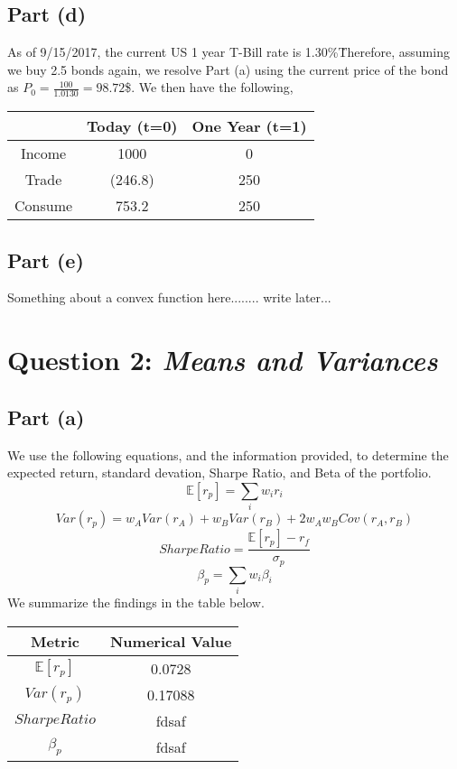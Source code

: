 \documentclass[12pt]{article}
\begin{document}
		\subsection{Part (d)}
		
			As of 9/15/2017, the current US 1 year T-Bill rate is 1.30\%\. Therefore, assuming we buy 2.5 bonds again, we resolve Part (a) using the current
			price of the bond as $P_{0} = \frac{100}{1.0130} = 98.72$\$. We then have the following,
			\begin{center}
 			\begin{tabular}{||c c c||} 
 			\hline
 			 & Today (t=0) &  One Year (t=1) \\ [0.5ex] 
 			\hline \hline
 			Income & 1000 & 0 \\ 
 			\hline
 			Trade  & (246.8) & 250 \\
 			\hline
 			 Consume & 753.2 & 250  \\
 			\hline
			\end{tabular}
			\end{center}
				
		\subsection{Part (e)}
		
			Something about a convex function here........ write later...
			
		
\section{Question 2: \textit{Means and Variances}}

	\subsection{Part (a)}
	
		We use the following equations, and the information provided, to determine the expected return, standard devation, Sharpe Ratio, and Beta of the portfolio. 
		$$ \mathbb{E}[r_{p}] = \sum_{i} w_{i} r_{i} $$
		$$ Var(r_{p}) = w_{A}Var(r_{A}) + w_{B}Var(r_{B}) + 2w_{A}w_{B}Cov(r_{A},r_{B}) $$
		$$ Sharpe Ratio = \frac{\mathbb{E}[r_{p}] - r_{f}}{\sigma_{p}} $$
		$$ \beta_{p} = \sum_{i} w_{i} \beta_{i} $$
		We summarize the findings in the table below. 
		\begin{center}
 		\begin{tabular}{||c c||} 
 		\hline
 		 Metric & Numerical Value \\ [0.5ex] 
 		\hline \hline
 		$\mathbb{E}[r_{p}]$ & 0.0728 \\ 
 		\hline
 		$Var(r_{p})$ & 0.17088 \\
 		\hline
 		$Sharpe Ratio$ & fdsaf  \\
 		\hline
 		$\beta_{p}$ & fdsaf  \\
 		\hline
		\end{tabular}
		\end{center}
\end{document}
